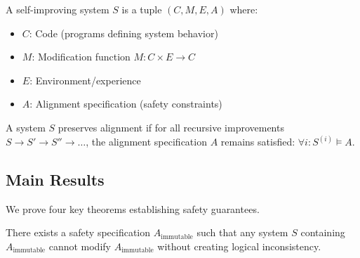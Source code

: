 \documentclass[11pt,letterpaper]{article}
\begin{document}
\begin{definition}
A self-improving system $S$ is a tuple $(C, M, E, A)$ where:
\begin{itemize}
\item $C$: Code (programs defining system behavior)
\item $M$: Modification function $M: C \times E \rightarrow C$
\item $E$: Environment/experience
\item $A$: Alignment specification (safety constraints)
\end{itemize}
\end{definition}

\begin{definition}
A system $S$ preserves alignment if for all recursive improvements $S \rightarrow S' \rightarrow S'' \rightarrow \ldots$, the alignment specification $A$ remains satisfied: $\forall i: S^{(i)} \models A$.
\end{definition}

\subsection{Main Results}

We prove four key theorems establishing safety guarantees.

\begin{theorem}
There exists a safety specification $A_{\text{immutable}}$ such that any system $S$ containing $A_{\text{immutable}}$ cannot modify $A_{\text{immutable}}$ without creating logical inconsistency.
\end{theorem}
\end{document}
